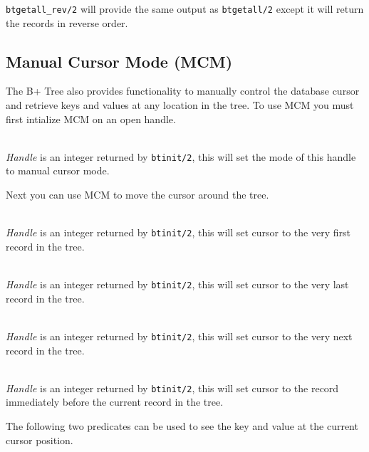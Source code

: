 {\tt btgetall\_rev/2} will provide the same output as {\tt btgetall/2} except it will return the records in reverse order.

\subsection{Manual Cursor Mode (MCM)}

The B+ Tree also provides functionality to manually control the database cursor and retrieve keys and values at any location in the tree.
To use MCM you must first intialize MCM on an open handle.

\begin{description}

\item[btminit({\it +Handle})]\mbox{}
  \\
    {\it Handle} is an integer returned by {\tt btinit/2}, this will set the mode of this handle to manual cursor mode.

\end{description}

Next you can use MCM to move the cursor around the tree.

\begin{description}

\item[btmfirst({\it +Handle})]\mbox{}
  \\
    {\it Handle} is an integer returned by {\tt btinit/2}, this will set cursor to the very first record in the tree.
\item[btmlast({\it +Handle})]\mbox{}
  \\
    {\it Handle} is an integer returned by {\tt btinit/2}, this will set cursor to the very last record in the tree.
\item[btmnext({\it +Handle})]\mbox{}
  \\
    {\it Handle} is an integer returned by {\tt btinit/2}, this will set cursor to the very next record in the tree.
\item[btmprev({\it +Handle})]\mbox{}
  \\
    {\it Handle} is an integer returned by {\tt btinit/2}, this will set cursor to the record immediately before the current record in the tree.

\end{description}

The following two predicates can be used to see the key and value at the current cursor position.

